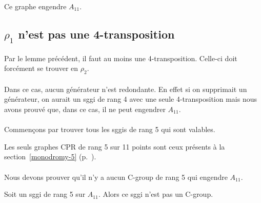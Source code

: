 \begin{lemma}
  Ce graphe engendre $A_{11}$.
\end{lemma}

\subsection{$\rho_1$ n'est pas une 4-transposition}

\paragraph{}
Par le lemme précédent, il faut au moins une 4-transposition. Celle-ci doit forcément se trouver en $\rho_2$.

\paragraph{}
Dans ce cas, aucun générateur n'est redondante. En effet si on supprimait un générateur, on aurait un sggi de rang 4 avec une seule 4-transposition mais nous avons prouvé que, dans ce cas, il ne peut engendrer $A_11$.

\paragraph{}
Commençons par trouver tous les sggis de rang 5 qui sont valables.

\begin{theorem}
  Les seuls graphes CPR de rang 5 sur 11 points sont ceux présents à la section~\ref{monodromy-5} (p.~\pageref{monodromy-5}).

\end{theorem}

\paragraph{}
Nous devons prouver qu'il n'y a aucun C-group de rang 5 qui engendre $A_{11}$.

\begin{theorem}
  Soit un sggi de rang 5 sur $A_{11}$. Alors ce sggi n'est pas un C-group.
\end{theorem}

